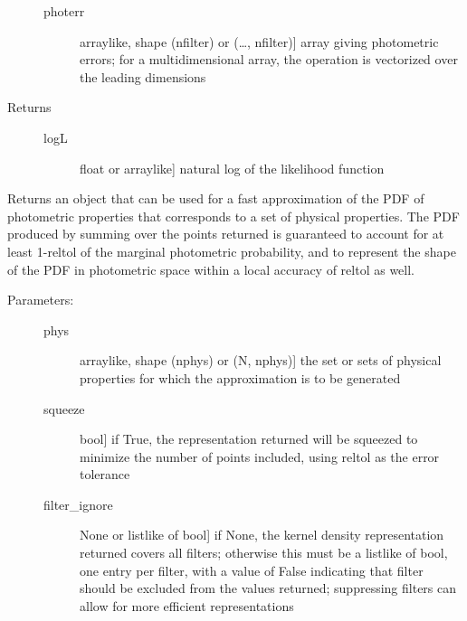 \documentclass[letterpaper,10pt,english]{sphinxmanual}
\begin{document}
\begin{fulllineitems}
\begin{fulllineitems}
\begin{description}
\begin{description}
\item[{photerr}] \leavevmode{[}arraylike, shape (nfilter) or (…, nfilter){]}
array giving photometric errors; for a multidimensional
array, the operation is vectorized over the leading
dimensions

\end{description}

\item[{Returns}] \leavevmode\begin{description}
\item[{logL}] \leavevmode{[}float or arraylike{]}
natural log of the likelihood function

\end{description}

\end{description}

\end{fulllineitems}


\begin{fulllineitems}
\label{\detokenize{bayesphot:slugpy.bayesphot.bp.bp.make_approx_phot}}
Returns an object that can be used for a fast approximation of
the PDF of photometric properties that corresponds to a set of
physical properties. The PDF produced by summing over the
points returned is guaranteed to account for at least 1-reltol
of the marginal photometric probability, and to represent the
shape of the PDF in photometric space within a local accuracy
of reltol as well.
\begin{description}
\item[{Parameters:}] \leavevmode\begin{description}
\item[{phys}] \leavevmode{[}arraylike, shape (nphys) or (N, nphys){]}
the set or sets of physical properties for which the
approximation is to be generated

\item[{squeeze}] \leavevmode{[}bool{]}
if True, the representation returned will be squeezed to
minimize the number of points included, using reltol as
the error tolerance

\item[{filter\_ignore}] \leavevmode{[}None or listlike of bool{]}
if None, the kernel density representation returned
covers all filters; otherwise this must be a listlike of
bool, one entry per filter, with a value of False
indicating that filter should be excluded from the
values returned; suppressing filters can allow for more
efficient representations


\end{description}
\end{description}
\end{fulllineitems}
\end{fulllineitems}
\end{document}
